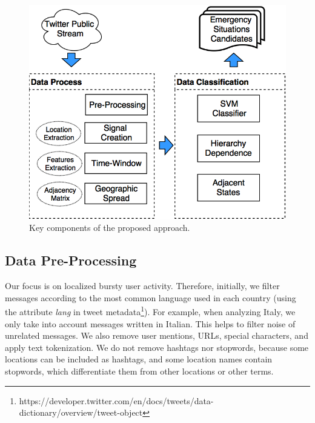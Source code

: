 \documentclass[sigconf]{acmart}
\begin{document}
\begin{figure}
	\centering
	\includegraphics[width=\columnwidth]{img/diagram4.png}
	\caption{Key components of the proposed approach.}
	\label{fig:diagram}
\end{figure}

\subsection{Data Pre-Processing}
 
Our focus is on localized bursty user activity. Therefore, initially, we filter messages according to the most common language used in each country (using the attribute \textit{lang} in tweet metadata\footnote{https://developer.twitter.com/en/docs/tweets/data-dictionary/overview/tweet-object}). For example, when analyzing Italy, we only take into account messages written in Italian. This helps to filter noise of unrelated messages. We also remove user mentions, URLs,  special characters, and apply text tokenization. We do not remove hashtags nor stopwords, because some locations can be included as hashtags, and some location names contain stopwords, which differentiate them from other locations or other terms.
\end{document}
